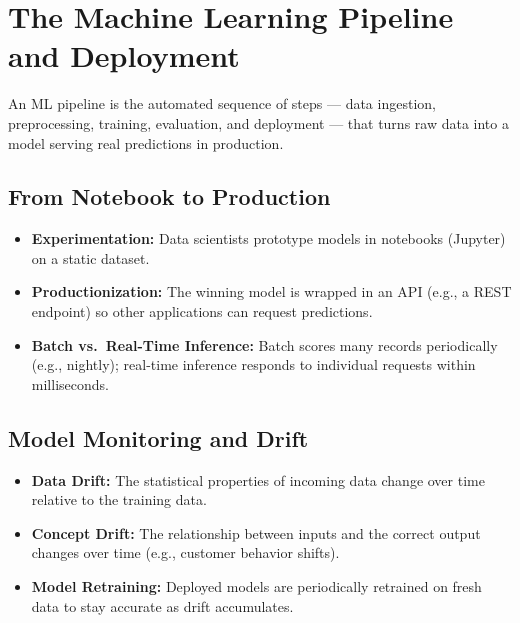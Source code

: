 \documentclass[11pt,a4paper]{article}
\begin{document}
\section{The Machine Learning Pipeline and Deployment}

\begin{definitionbox}[ML Pipeline]
An ML pipeline is the automated sequence of steps --- data ingestion, preprocessing, training, evaluation, and deployment --- that turns raw data into a model serving real predictions in production.
\end{definitionbox}

\subsection{From Notebook to Production}
\begin{itemize}[leftmargin=*]
  \item \textbf{Experimentation:} Data scientists prototype models in notebooks (Jupyter) on a static dataset.
  \item \textbf{Productionization:} The winning model is wrapped in an API (e.g., a REST endpoint) so other applications can request predictions.
  \item \textbf{Batch vs.\ Real-Time Inference:} Batch scores many records periodically (e.g., nightly); real-time inference responds to individual requests within milliseconds.
\end{itemize}

\subsection{Model Monitoring and Drift}
\begin{conceptbox}
\begin{itemize}[leftmargin=*]
  \item \textbf{Data Drift:} The statistical properties of incoming data change over time relative to the training data.
  \item \textbf{Concept Drift:} The relationship between inputs and the correct output changes over time (e.g., customer behavior shifts).
  \item \textbf{Model Retraining:} Deployed models are periodically retrained on fresh data to stay accurate as drift accumulates.
\end{itemize}
\end{conceptbox}
\end{document}
